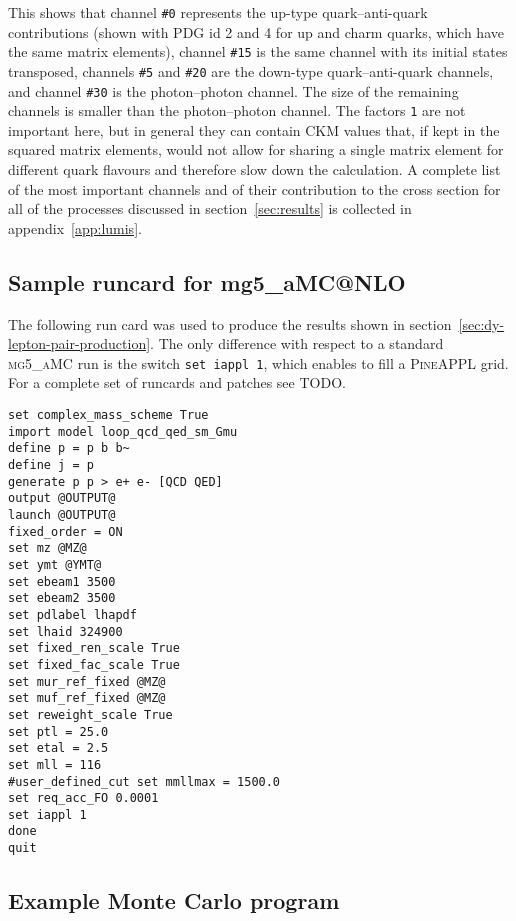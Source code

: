 This shows that channel \texttt{\#0} represents the up-type quark--anti-quark contributions (shown with PDG id 2 and 4 for up and charm quarks, which have the same matrix elements), channel \texttt{\#15} is the same channel with its initial states transposed, channels \texttt{\#5} and \texttt{\#20} are the down-type quark--anti-quark channels, and channel \texttt{\#30} is the photon--photon channel.
The size of the remaining channels is smaller than the photon--photon channel.
The factors \texttt{1} are not important here, but in general they can contain CKM values that, if kept in the squared matrix elements, would not allow for sharing a single matrix element for different quark flavours and therefore slow down the calculation. A complete list of the most important channels and of their
contribution to the cross section for all of the processes discussed in
section~\ref{sec:results} is collected in appendix~\ref{app:lumis}.

\subsection{Sample runcard for mg5\_aMC@NLO}
\label{app:sample-runcard}

The following run card was used to produce the results shown in section~\ref{sec:dy-lepton-pair-production}.
The only difference with respect to a standard \textsc{mg5\_aMC} run is the switch \texttt{set iappl 1}, which enables to fill a \textsc{PineAPPL} grid.
For a complete set of runcards and patches see TODO.
\begin{verbatim}
set complex_mass_scheme True
import model loop_qcd_qed_sm_Gmu
define p = p b b~
define j = p
generate p p > e+ e- [QCD QED]
output @OUTPUT@
launch @OUTPUT@
fixed_order = ON
set mz @MZ@
set ymt @YMT@
set ebeam1 3500
set ebeam2 3500
set pdlabel lhapdf
set lhaid 324900
set fixed_ren_scale True
set fixed_fac_scale True
set mur_ref_fixed @MZ@
set muf_ref_fixed @MZ@
set reweight_scale True
set ptl = 25.0
set etal = 2.5
set mll = 116
#user_defined_cut set mmllmax = 1500.0
set req_acc_FO 0.0001
set iappl 1
done
quit
\end{verbatim}

\subsection{Example Monte Carlo program}
\label{app:example-program}




